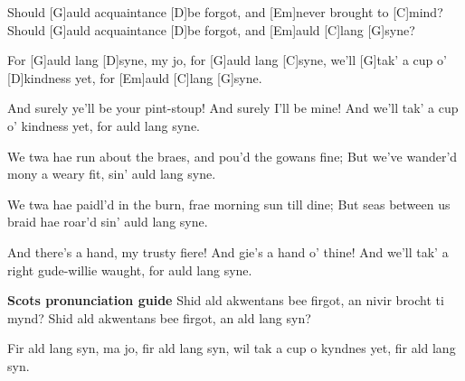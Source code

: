 


\begin{guitar}
	Should [G]auld acquaintance [D]be forgot, and [Em]never brought to [C]mind?
	Should [G]auld acquaintance [D]be forgot, and [Em]auld [C]lang [G]syne?
	
	For [G]auld lang [D]syne, my jo, for [G]auld lang [C]syne,
	we'll [G]tak' a cup o' [D]kindness yet, for [Em]auld [C]lang [G]syne.
	
	And surely ye'll be your pint-stoup! And surely I'll be mine!
	And we'll tak' a cup o’ kindness yet, for auld lang syne.
	
	 
	
	We twa hae run about the braes, and pou'd the gowans fine;
	But we've wander'd mony a weary fit, sin' auld lang syne.
	
	 
	
	We twa hae paidl'd in the burn, frae morning sun till dine;
	But seas between us braid hae roar'd sin' auld lang syne.
	
	 
	
	And there's a hand, my trusty fiere! And gie's a hand o' thine!
	And we'll tak' a right gude-willie waught, for auld lang syne.
	
	 
	
	\pagebreak
	\hspace*{\fill} \textbf{Scots pronunciation guide}
	Shid ald akwentans bee firgot, an nivir brocht ti mynd?
	Shid ald akwentans bee firgot, an ald lang syn?
	
	\hspace*{10pt}
	\hspace*{10pt}Fir ald lang syn, ma jo, fir ald lang syn,
	\hspace*{10pt}wil tak a cup o kyndnes yet, fir ald lang syn.
	

\end{guitar}
